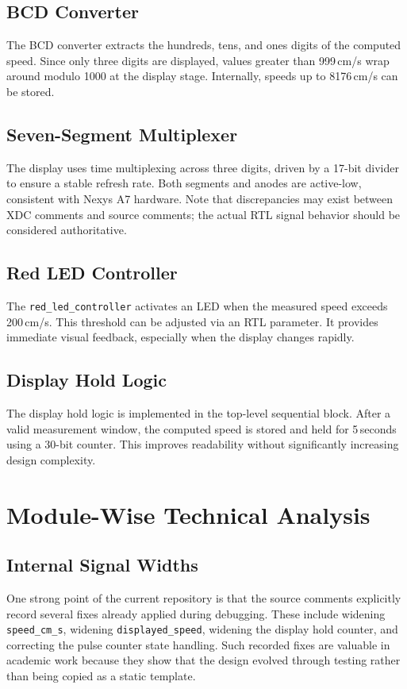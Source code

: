 \documentclass[conference,a4paper]{IEEEtran}
\begin{document}
\subsection{BCD Converter}
The BCD converter extracts the hundreds, tens, and ones digits of the computed speed. Since only three digits are displayed, values greater than 999\,cm/s wrap around modulo 1000 at the display stage. Internally, speeds up to 8176\,cm/s can be stored.

\subsection{Seven-Segment Multiplexer}
The display uses time multiplexing across three digits, driven by a 17-bit divider to ensure a stable refresh rate. Both segments and anodes are active-low, consistent with Nexys A7 hardware. Note that discrepancies may exist between XDC comments and source comments; the actual RTL signal behavior should be considered authoritative.

\subsection{Red LED Controller}
The \texttt{red\_led\_controller} activates an LED when the measured speed exceeds 200\,cm/s. This threshold can be adjusted via an RTL parameter. It provides immediate visual feedback, especially when the display changes rapidly.

\subsection{Display Hold Logic}
The display hold logic is implemented in the top-level sequential block. After a valid measurement window, the computed speed is stored and held for 5\,seconds using a 30-bit counter. This improves readability without significantly increasing design complexity.

\section{Module-Wise Technical Analysis}

\subsection{Internal Signal Widths}
One strong point of the current repository is that the source comments explicitly record several fixes already applied during debugging. These include widening \texttt{speed\_cm\_s}, widening \texttt{displayed\_speed}, widening the display hold counter, and correcting the pulse counter state handling. Such recorded fixes are valuable in academic work because they show that the design evolved through testing rather than being copied as a static template.
\end{document}

